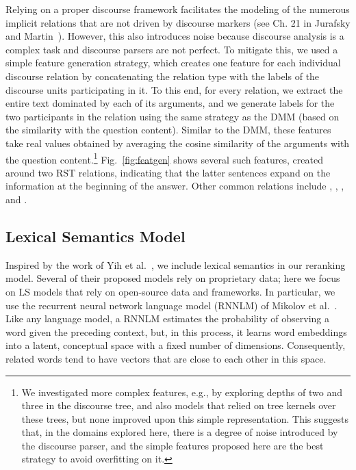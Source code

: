 Relying on a proper discourse framework facilitates the modeling of the numerous implicit relations that are not driven by discourse markers (see Ch. 21 in Jurafsky and Martin~\citeyear{jurafsky09}). However, this also introduces noise because discourse analysis is a complex task and discourse parsers are not perfect. 
To mitigate this, we used a simple feature generation strategy, which creates one feature for each individual discourse relation by concatenating the relation type with the labels of the discourse units participating in it. 
To this end, for every relation, we extract the entire text dominated by each of its arguments, and we generate labels for the two participants in the relation using the same strategy as the DMM (based on the similarity with the question content). 
Similar to the DMM, these features take real values obtained by averaging the cosine similarity of the arguments with the question content.\footnote{We investigated more complex features, e.g., by exploring depths of two and three in the discourse tree, and also models that relied on tree kernels over these trees, but none improved upon this simple representation. This suggests that, in the domains explored here, there is a degree of noise introduced by the discourse parser, and the simple features proposed here are the best strategy to avoid overfitting on it.} Fig.~\ref{fig:featgen} shows several such features, created around two RST  relations,  indicating that the latter sentences expand on the information at the beginning of the answer.  
Other common relations include , , , and .

\subsection{Lexical Semantics Model}
\label{sec-naacl2015:lexicalsemantics}

Inspired by the work of Yih et al.~\citeyear{yih13}, we include lexical semantics in our reranking model. 
Several of their proposed models rely on proprietary data; here we focus on LS models that rely on open-source data and frameworks. 
In particular, we use the recurrent neural network language model (RNNLM) of Mikolov et al.~\citeyear{mikolov13,mikolov10}.
Like any language model, a RNNLM estimates the probability of observing a word given the preceding context, but, in this process, it learns word embeddings into a latent, conceptual space with a fixed number of dimensions. 
Consequently, related words tend to have vectors that are close to each other in this space.

